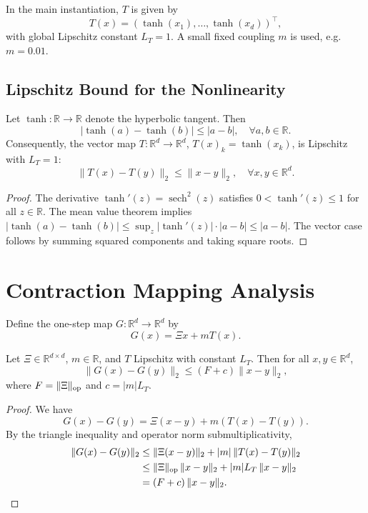 \documentclass[11pt,letterpaper]{article}
\begin{document}
In the main instantiation, \(T\) is given by
\[
  T(x) = (\tanh(x_1),\dots,\tanh(x_d))^\top,
\]
with global Lipschitz constant \(L_T = 1\).
A small fixed coupling \(m\) is used, e.g.\ \(m = 0.01\).

\subsection{Lipschitz Bound for the Nonlinearity}

\begin{lemma}
Let \(\tanh: \mathbb{R}\to\mathbb{R}\) denote the hyperbolic tangent.
Then
\[
  |\tanh(a) - \tanh(b)| \le |a-b|, \quad \forall a,b\in\mathbb{R}.
\]
Consequently, the vector map \(T: \mathbb{R}^d\to\mathbb{R}^d\),
\(T(x)_k = \tanh(x_k)\), is Lipschitz with \(L_T = 1\):
\[
  \|T(x) - T(y)\|_2 \le \|x-y\|_2, \quad \forall x,y\in\mathbb{R}^d.
\]
\end{lemma}

\begin{proof}
The derivative \(\tanh'(z) = \operatorname{sech}^2(z)\) satisfies
\(0 < \tanh'(z) \le 1\) for all \(z\in\mathbb{R}\). The mean value theorem implies
\(|\tanh(a)-\tanh(b)| \le \sup_z |\tanh'(z)| \cdot |a-b| \le |a-b|\).
The vector case follows by summing squared components and taking square roots.
\end{proof}

\section{Contraction Mapping Analysis}

Define the one-step map \(G: \mathbb{R}^d\to\mathbb{R}^d\) by
\begin{equation}
  G(x) = \Xi x + m T(x).
\end{equation}

\begin{lemma}
\label{lem:G-Lipschitz}
Let \(\Xi\in\mathbb{R}^{d\times d}\), \(m\in\mathbb{R}\), and
\(T\) Lipschitz with constant \(L_T\). Then for all \(x,y\in\mathbb{R}^d\),
\[
  \|G(x) - G(y)\|_2
  \le (F + c)
       \|x-y\|_2,
\]
where \(F = \|\Xi\|_{\rm op}\) and \(c = |m|L_T\).
\end{lemma}

\begin{proof}
We have
\[
  G(x) - G(y) = \Xi(x-y) + m(T(x) - T(y)).
\]
By the triangle inequality and operator norm submultiplicativity,
\begin{align*}
  \|G(x)-G(y)\|_2
  &\le \|\Xi(x-y)\|_2 + |m|\,\|T(x)-T(y)\|_2 \\
  &\le \|\Xi\|_{\rm op}\,\|x-y\|_2 + |m|L_T\,\|x-y\|_2 \\
  &= (F + c)\,\|x-y\|_2.
\end{align*}
\end{proof}
\end{document}
